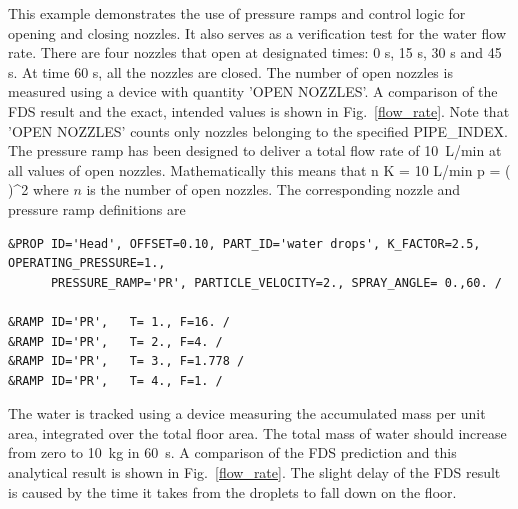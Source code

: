 \documentclass[11pt]{book}
\begin{document}
This example demonstrates the use of pressure ramps and control logic for opening and closing nozzles. It also serves as a verification test for the water flow rate. There are four nozzles that open at designated times: 0 s, 15 s, 30 s and 45 s. At time 60 s, all the nozzles are closed. The number of open nozzles is measured using a device with quantity {\ct 'OPEN NOZZLES'}. A comparison of the FDS result and the exact, intended values is shown in Fig.~\ref{flow_rate}.  Note that {\ct 'OPEN NOZZLES'} counts only nozzles belonging to the specified {\ct PIPE\_INDEX}. The pressure ramp has been designed to deliver a total flow rate of 10~L/min at all values of open nozzles. Mathematically this means that
\be
n K  = 10 \;\hbox{L/min} \quad \Rightarrow \quad
p = \left( \right)^2
\ee
where $n$ is the number of open nozzles. The corresponding nozzle and pressure ramp definitions are
\begin{lstlisting}
&PROP ID='Head', OFFSET=0.10, PART_ID='water drops', K_FACTOR=2.5, OPERATING_PRESSURE=1.,
      PRESSURE_RAMP='PR', PARTICLE_VELOCITY=2., SPRAY_ANGLE= 0.,60. /

&RAMP ID='PR',   T= 1., F=16. /
&RAMP ID='PR',   T= 2., F=4. /
&RAMP ID='PR',   T= 3., F=1.778 /
&RAMP ID='PR',   T= 4., F=1. /
\end{lstlisting}
The water is tracked using a device measuring the accumulated mass per unit area, integrated over the total floor area. The total mass of water should increase from zero to 10~kg in 60~s. A comparison of the FDS prediction and this analytical result is shown in Fig.~\ref{flow_rate}. The slight delay of the FDS result is caused by the time it takes from the droplets to fall down on the floor.
\end{document}
